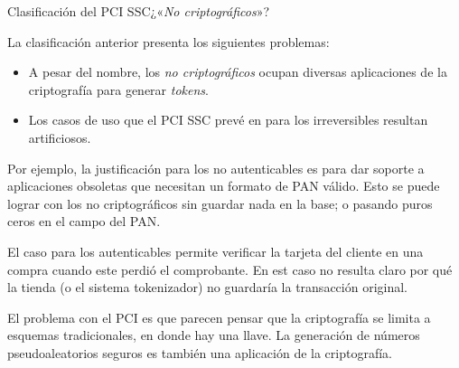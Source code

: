 \begin{frame}{Clasificación del PCI SSC}{¿«\textit{No criptográficos}»?}

  La clasificación anterior presenta los siguientes problemas:

  \begin{itemize}
    \item<1-> A pesar del nombre, los \textit{no criptográficos} ocupan
      diversas aplicaciones de la criptografía para generar \textit{tokens}.
    \item<2-> Los casos de uso que el PCI SSC prevé en \cite{pci_tokens} para
      los irreversibles resultan artificiosos.
  \end{itemize}

  {
    Por ejemplo, la justificación para los no autenticables es para dar
    soporte a aplicaciones obsoletas que necesitan un formato de PAN
    válido. Esto se puede lograr con los no criptográficos sin guardar
    nada en la base; o pasando puros ceros en el campo del PAN.

    El caso para los autenticables permite verificar la tarjeta del cliente
    en una compra cuando este perdió el comprobante. En est caso no resulta
    claro por qué la tienda (o el sistema tokenizador) no guardaría
    la transacción original.
  }

  {
    El problema con el PCI es que parecen pensar que la criptografía se
    limita a esquemas tradicionales, en donde hay una llave. La
    generación de números pseudoaleatorios seguros es también una
    aplicación de la criptografía.
  }

\end{frame}


